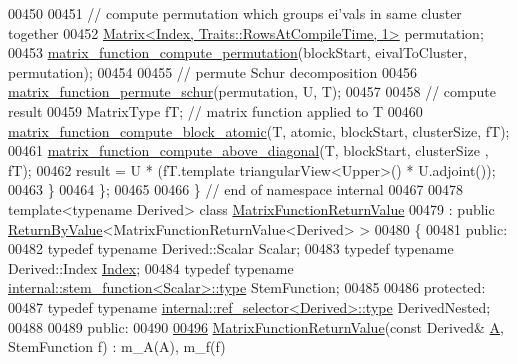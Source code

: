 \begin{DoxyCode}
00450 
00451     \textcolor{comment}{// compute permutation which groups ei'vals in same cluster together }
00452     \hyperlink{group___core___module_class_eigen_1_1_matrix}{Matrix<Index, Traits::RowsAtCompileTime, 1>} permutation;
00453     \hyperlink{namespace_eigen_1_1internal_a0434fe5b0ec47e69b8e351ef9e131bcd}{matrix\_function\_compute\_permutation}(blockStart, eivalToCluster, 
      permutation);
00454 
00455     \textcolor{comment}{// permute Schur decomposition}
00456     \hyperlink{namespace_eigen_1_1internal_a59cacdc2f9b480da246258bc9399aa2c}{matrix\_function\_permute\_schur}(permutation, U, T);
00457 
00458     \textcolor{comment}{// compute result}
00459     MatrixType fT; \textcolor{comment}{// matrix function applied to T}
00460     \hyperlink{namespace_eigen_1_1internal_a53e617df189868a791e44d2c4e94403f}{matrix\_function\_compute\_block\_atomic}(T, atomic, blockStart, 
      clusterSize, fT);
00461     \hyperlink{namespace_eigen_1_1internal_a8ff76c47bde59d8af688e5925bed8f17}{matrix\_function\_compute\_above\_diagonal}(T, blockStart, clusterSize
      , fT);
00462     result = U * (fT.template triangularView<Upper>() * U.adjoint());
00463   \}
00464 \};
00465 
00466 \} \textcolor{comment}{// end of namespace internal}
00467 
00478 \textcolor{keyword}{template}<\textcolor{keyword}{typename} Derived> \textcolor{keyword}{class }\hyperlink{class_eigen_1_1_matrix_function_return_value}{MatrixFunctionReturnValue}
00479 : \textcolor{keyword}{public} \hyperlink{group___core___module_class_eigen_1_1_return_by_value}{ReturnByValue}<MatrixFunctionReturnValue<Derived> >
00480 \{
00481   \textcolor{keyword}{public}:
00482     \textcolor{keyword}{typedef} \textcolor{keyword}{typename} Derived::Scalar Scalar;
00483     \textcolor{keyword}{typedef} \textcolor{keyword}{typename} Derived::Index \hyperlink{namespace_eigen_a62e77e0933482dafde8fe197d9a2cfde}{Index};
00484     \textcolor{keyword}{typedef} \textcolor{keyword}{typename} \hyperlink{struct_eigen_1_1internal_1_1stem__function}{internal::stem\_function<Scalar>::type} 
      StemFunction;
00485 
00486   \textcolor{keyword}{protected}:
00487     \textcolor{keyword}{typedef} \textcolor{keyword}{typename} \hyperlink{class_eigen_1_1internal_1_1_tensor_lazy_evaluator_writable}{internal::ref\_selector<Derived>::type} 
      DerivedNested;
00488 
00489   \textcolor{keyword}{public}:
00490 
\hyperlink{class_eigen_1_1_matrix_function_return_value_af193d7a3e1b4e65dc70e64eb4bc8e17f}{00496}     \hyperlink{class_eigen_1_1_matrix_function_return_value_af193d7a3e1b4e65dc70e64eb4bc8e17f}{MatrixFunctionReturnValue}(\textcolor{keyword}{const} Derived& \hyperlink{group___core___module_class_eigen_1_1_matrix}{A}, StemFunction f) : m\_A(A), m\_f(f) 

\end{DoxyCode}
